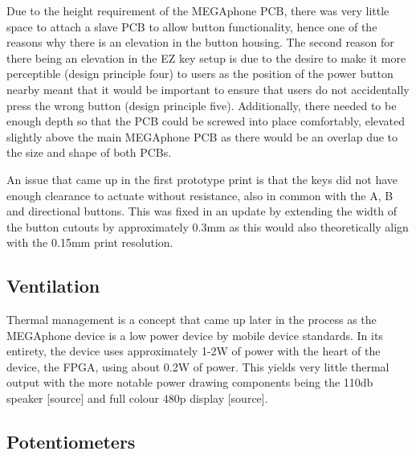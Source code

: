 Due to the height requirement of the MEGAphone PCB, there was very little space to attach a slave PCB to allow button functionality, hence one of the reasons why there is an elevation in the button housing.
The second reason for there being an elevation in the EZ key setup is due to the desire to make it more perceptible (design principle four) to users as the position of the power button nearby meant that it would be important to ensure that users do not accidentally press the wrong button (design principle five).
Additionally, there needed to be enough depth so that the PCB could be screwed into place comfortably, elevated slightly above the main MEGAphone PCB as there would be an overlap due to the size and shape of both PCBs.

An issue that came up in the first prototype print is that the keys did not have enough clearance to actuate without resistance, also in common with the A, B and directional buttons.
This was fixed in an update by extending the width of the button cutouts by approximately 0.3mm as this would also theoretically align with the 0.15mm print resolution. %


\subsection{Ventilation} %

Thermal management is a concept that came up later in the process as the MEGAphone device is a low power device by mobile device standards.
In its entirety, the device uses approximately 1-2W of power with the heart of the device, the FPGA, using about 0.2W of power.
This yields very little thermal output with the more notable power drawing components being the 110db speaker [source] and full colour 480p display [source].

\subsection{Potentiometers}

